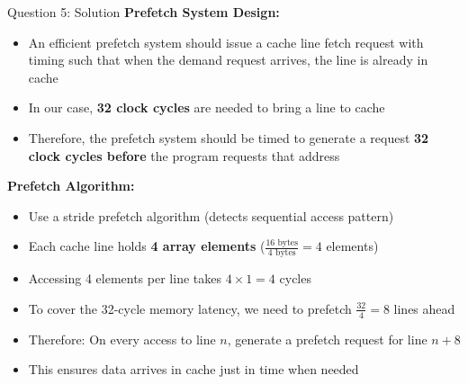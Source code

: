 \documentclass[aspectratio=169,12pt]{beamer}
\begin{document}
\begin{frame}{Question 5: Solution}
\textbf{Prefetch System Design:}

\begin{itemize}
    \item An efficient prefetch system should issue a cache line fetch request with timing such that when the demand request arrives, the line is already in cache
    \item In our case, \textcolor{blue!70!black}{\textbf{32 clock cycles}} are needed to bring a line to cache
    \item Therefore, the prefetch system should be timed to generate a request \textcolor{blue!70!black}{\textbf{32 clock cycles before}} the program requests that address
\end{itemize}

\vspace{0.3cm}
\textbf{Prefetch Algorithm:}
\begin{itemize}
    \item Use a stride prefetch algorithm (detects sequential access pattern)
    \item Each cache line holds \textcolor{blue!70!black}{\textbf{4 array elements}} ($\frac{16 \text{ bytes}}{4 \text{ bytes}} = 4$ elements)
    \item Accessing 4 elements per line takes $4 \times 1 = 4$ cycles
    \item To cover the 32-cycle memory latency, we need to prefetch $\frac{32}{4} = 8$ lines ahead
    \item Therefore: On every access to line $n$, generate a prefetch request for line \textcolor{red!70!black}{\textbf{$n+8$}}
    \item This ensures data arrives in cache just in time when needed
\end{itemize}
\end{frame}
\end{document}
